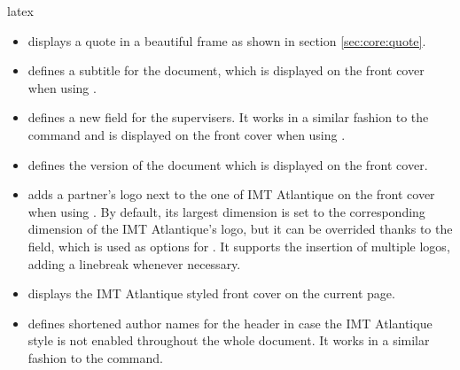 \documentclass{report}
\begin{document}
\begin{imtaCode}{latex}
    \RequirePackage{mdframed}
\end{imtaCode}



\begin{itemize}
    \item {} displays a quote in a beautiful frame as shown in section \ref{sec:core:quote}.
\end{itemize}


\begin{itemize}
    \item {} defines a subtitle for the document, which is displayed on the front cover when using .
    
    \item {} defines a new field for the supervisers. 
    It works in a similar fashion to the  command and is displayed on the front cover when using .
    
    \item {} defines the version of the document which is displayed on the front cover.
    
    \item {} adds a partner's logo next to the one of IMT Atlantique on the front cover when using . 
    By default, its largest dimension is set to the corresponding dimension of the IMT Atlantique's logo, but it can be overrided thanks to the  field, which is used as options for . 
    It supports the insertion of multiple logos, adding a linebreak whenever necessary.
    
    \item {} displays the IMT Atlantique styled front cover on the current page.
    
    \item {} defines shortened author names for the header in case the IMT Atlantique style is not enabled throughout the whole document.
    It works in a similar fashion to the  command.
    

\end{itemize}
\end{document}

